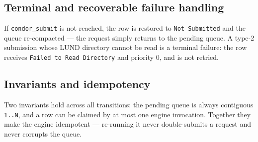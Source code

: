 \subsection{Terminal and recoverable failure handling}

If \texttt{condor\_\allowbreak{}submit} is not reached, the row is restored to \texttt{Not Submitted} and the
queue re-compacted --- the request simply returns to the pending queue. A type-2 submission whose LUND
directory cannot be read is a terminal failure: the row receives \texttt{Failed to Read Directory} and priority
0, and is not retried.

\subsection{Invariants and idempotency}

Two invariants hold across all transitions: the pending queue is always contiguous
\texttt{1.\allowbreak{}.\allowbreak{}N}, and a row can be claimed by at most one engine invocation. Together
they make the engine idempotent --- re-running it never double-submits a request and never corrupts the queue.

